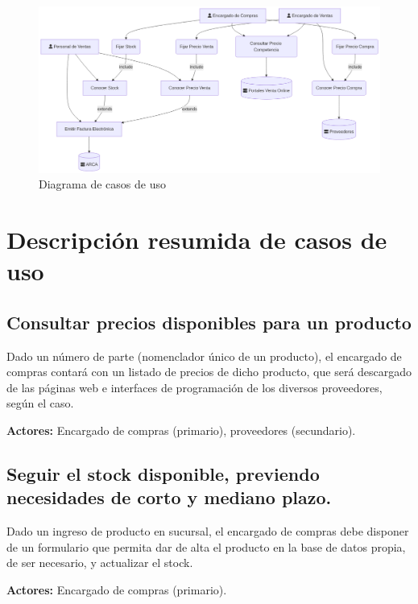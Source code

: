\begin{figure}[h!]
	\vspace{20pt}
	\centering
	\vspace{15pt}
	\includegraphics[width=\textwidth]{img/01-diagrama-casos-uso}
	\caption{Diagrama de casos de uso}
	\vspace{15pt}
\end{figure}

\pagebreak

\section{Descripción resumida de casos de uso}

\subsection{Consultar precios disponibles para un producto}

Dado un número de parte (nomenclador único de un producto),
el encargado de compras contará con un listado de precios de dicho producto,
que será descargado de las páginas web e interfaces de programación de los diversos proveedores,
según el caso.

\textbf{Actores:} Encargado de compras (primario), proveedores (secundario).

\subsection{Seguir el stock disponible, previendo necesidades de corto y mediano plazo.}

Dado un ingreso de producto en sucursal,
el encargado de compras debe disponer de un formulario que permita dar de alta el producto en la base de datos propia,
de ser necesario,
y actualizar el stock.

\textbf{Actores:} Encargado de compras (primario).

